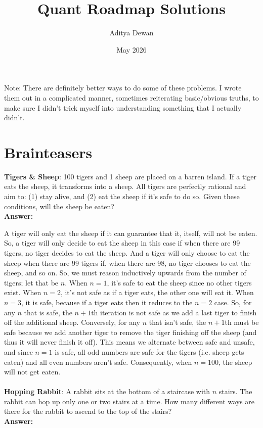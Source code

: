 \documentclass{article}
\title{Quant Roadmap Solutions}
\author{Aditya Dewan}
\date{May 2026}
\begin{document}
\maketitle

Note: There are definitely better ways to do some of these problems. I wrote them out in a complicated manner, sometimes reiterating basic/obvious truths, to make sure I didn't trick myself into understanding something that I actually didn't.

\section{Brainteasers}

\textbf{Tigers \& Sheep}: 100 tigers and 1 sheep are placed on a barren island. If a tiger eats the sheep, it transforms into a sheep. All tigers are perfectly rational and aim to: (1) stay alive, and (2) eat the sheep if it’s safe to do so. Given these conditions, will the sheep be eaten?
\\
\textbf{Answer:} 

A tiger will only eat the sheep if it can guarantee that it, itself, will not be eaten. So, a tiger will only decide to eat the sheep in this case if when there are 99 tigers, no tiger decides to eat the sheep. And a tiger will only choose to eat the sheep when there are 99 tigers if, when there are 98, no tiger chooses to eat the sheep, and so on. So, we must reason inductively upwards from the number of tigers; let that be $n$. When $n=1$, it's safe to eat the sheep since no other tigers exist. When $n=2$, it's not safe as if a tiger eats, the other one will eat it. When $n=3$, it is safe, because if a tiger eats then it reduces to the $n=2$ case. So, for any $n$  that is safe, the $n+1$th iteration is not safe as we add a last tiger to finish off the additional sheep. Conversely, for any $n$ that isn't safe, the $n+1$th must be safe because we add another tiger to remove the tiger finishing off the sheep (and thus it will never finish it off). This means we alternate between safe and unsafe, and since $n=1$ is safe, all odd numbers are safe for the tigers (i.e. sheep gets eaten) and all even numbers aren't safe. Consequently, when $n=100$, the sheep will not get eaten.
\\\\
\textbf{Hopping Rabbit}: A rabbit sits at the bottom of a staircase with $n$ stairs. The rabbit can hop up only one or two stairs at a time. How many different ways are there for the rabbit to ascend to the top of the stairs?
\\
\textbf{Answer:}
\end{document}
